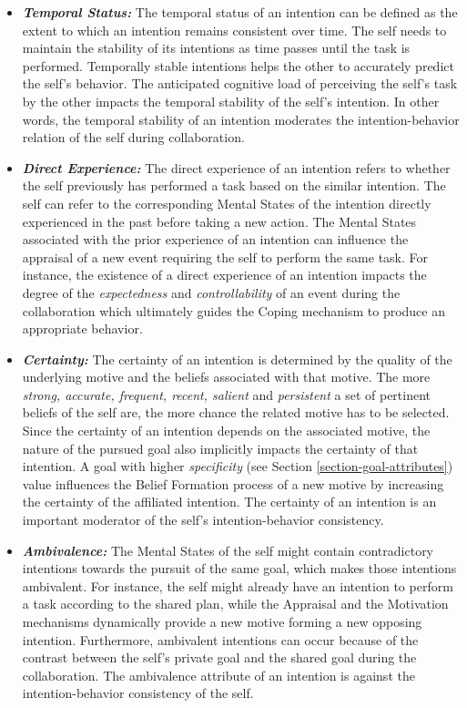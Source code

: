 \documentclass[12pt]{report}
\begin{document}
\begin{itemize}
  \item \textbf{\textit{Temporal Status:}} The temporal status of an intention
  can be defined as the extent to which an intention remains consistent over
  time. The self needs to maintain the stability of its intentions as time
  passes until the task is performed. Temporally stable intentions helps the
  other to accurately predict the self's behavior. The anticipated cognitive
  load of perceiving the self's task by the other impacts the temporal stability
  of the self's intention. In other words, the temporal stability of an
  intention moderates the intention-behavior relation of the self during
  collaboration.
  
  \item \textbf{\textit{Direct Experience:}} The direct experience of an
  intention refers to whether the self previously has performed a task based on
  the similar intention. The self can refer to the corresponding Mental States
  of the intention directly experienced in the past before taking a new action.
  The Mental States associated with the prior experience of an intention can
  influence the appraisal of a new event requiring the self to perform the same
  task. For instance, the existence of a direct experience of an intention
  impacts the degree of the \textit{expectedness} and \textit{controllability}
  of an event during the collaboration which ultimately guides the Coping
  mechanism to produce an appropriate behavior.
  
  \item \textbf{\textit{Certainty:}} The certainty of an intention is determined
  by the quality of the underlying motive and the beliefs associated with that
  motive. The more \textit{strong, accurate, frequent, recent, salient} and
  \textit{persistent} a set of pertinent beliefs of the self are, the more
  chance the related motive has to be selected. Since the certainty of an
  intention depends on the associated motive, the nature of the pursued goal also
  implicitly impacts the certainty of that intention. A goal with higher
  \textit{specificity} (see Section \ref{section-goal-attributes}) value
  influences the Belief Formation process of a new motive by increasing the
  certainty of the affiliated intention. The certainty of an intention is an
  important moderator of the self's intention-behavior consistency.
  
  \item \textbf{\textit{Ambivalence:}} The Mental States of the self might
  contain contradictory intentions towards the pursuit of the same goal, which
  makes those intentions ambivalent. For instance, the self might already have
  an intention to perform a task according to the shared plan, while the Appraisal
  and the Motivation mechanisms dynamically provide a new motive forming a new
  opposing intention. Furthermore, ambivalent intentions can occur because of
  the contrast between the self's private goal and the shared goal during the
  collaboration. The ambivalence attribute of an intention is against the
  intention-behavior consistency of the self.
  

\end{itemize}
\end{document}
